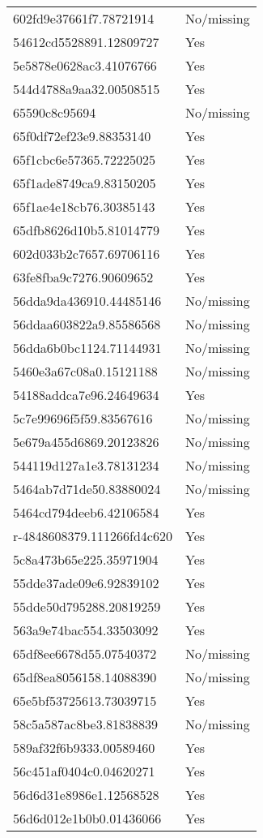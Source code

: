 \begin{tabular}{ll}
602fd9e37661f7.78721914 & No/missing \\
54612cd5528891.12809727 & Yes \\
5e5878e0628ac3.41076766 & Yes \\
544d4788a9aa32.00508515 & Yes \\
65590c8c95694 & No/missing \\
65f0df72ef23e9.88353140 & Yes \\
65f1cbc6e57365.72225025 & Yes \\
65f1ade8749ca9.83150205 & Yes \\
65f1ae4e18cb76.30385143 & Yes \\
65dfb8626d10b5.81014779 & Yes \\
602d033b2c7657.69706116 & Yes \\
63fe8fba9c7276.90609652 & Yes \\
56dda9da436910.44485146 & No/missing \\
56ddaa603822a9.85586568 & No/missing \\
56dda6b0bc1124.71144931 & No/missing \\
5460e3a67c08a0.15121188 & No/missing \\
54188addca7e96.24649634 & Yes \\
5c7e99696f5f59.83567616 & No/missing \\
5e679a455d6869.20123826 & No/missing \\
544119d127a1e3.78131234 & No/missing \\
5464ab7d71de50.83880024 & No/missing \\
5464cd794deeb6.42106584 & Yes \\
r-4848608379.111266fd4c620 & Yes \\
5c8a473b65e225.35971904 & Yes \\
55dde37ade09e6.92839102 & Yes \\
55dde50d795288.20819259 & Yes \\
563a9e74bac554.33503092 & Yes \\
65df8ee6678d55.07540372 & No/missing \\
65df8ea8056158.14088390 & No/missing \\
65e5bf53725613.73039715 & Yes \\
58c5a587ac8be3.81838839 & No/missing \\
589af32f6b9333.00589460 & Yes \\
56c451af0404c0.04620271 & Yes \\
56d6d31e8986e1.12568528 & Yes \\
56d6d012e1b0b0.01436066 & Yes \\

\end{tabular}
